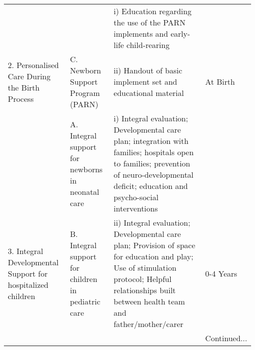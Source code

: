 \documentclass[12pt]{article}
\begin{document}
\begin{spacing}{1.4}
\begin{landscape}
\begin{table}[htpb!]
\begin{tabular}{p{4.5cm}p{5cm}p{10cm}p{2.5cm}}
& &i) \cellcolor{dccol}Education regarding the use of the PARN implements and early-life child-rearing  &\\
\multirow{-6}{4.5cm}{2. Personalised Care During the Birth Process}              &\multirow{-2}{5cm}{C. Newborn Support Program (PARN)}&ii) Handout of basic implement set and educational material &\multirow{-6}{2.5cm}{At Birth}\\ \midrule
\cellcolor{dccol}&\vspace{2mm}\cellcolor{dccol}A. Integral support for newborns in neonatal care &\cellcolor{dccol} i) Integral evaluation; Developmental care plan; integration with families; hospitals open to families; prevention of neuro-developmental deficit; education and psycho-social interventions&\cellcolor{dccol} \\
\multirow{-2}{4.5cm}{\cellcolor{dccol}3. Integral Developmental Support for hospitalized children}&\vspace{2mm}B. Integral support for children in pediatric care&ii) Integral evaluation; Developmental care plan; Provision of space for education and play; Use of stimulation protocol; Helpful relationships built between  health team and father/mother/carer &\multirow{-2}{2.5cm}{\cellcolor{dccol} 0-4 Years}\\ \midrule
&&& Continued...
  \end{tabular}
\end{table}
\end{landscape}


\end{spacing}
\end{document}
